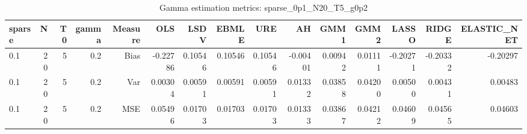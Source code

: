 \begin{table}[!htbp]\centering
\caption{Gamma estimation metrics: sparse_0p1_N20_T5_g0p2}
\label{tab:table1_sparse_0p1_N20_T5_g0p2}
\begin{tabular}{lrrrrrrrrrrrrrr}
\hline
sparse & N & T0 & gamma & Measure & OLS & LSDV & EBMLE & URE & AH & GMM1 & GMM2 & LASSO & RIDGE & ELASTIC_NET \\
\hline
0.1 & 20 & 5 & 0.2 & Bias & -0.22786 & 0.10546 & 0.10546 & 0.10546 & -0.00401 & 0.00942 & 0.01111 & -0.20271 & -0.20332 & -0.20297 \\
0.1 & 20 & 5 & 0.2 & Var & 0.00304 & 0.00591 & 0.00591 & 0.00591 & 0.01332 & 0.03858 & 0.04200 & 0.00500 & 0.00431 & 0.00483 \\
0.1 & 20 & 5 & 0.2 & MSE & 0.05496 & 0.01703 & 0.01703 & 0.01703 & 0.01333 & 0.03867 & 0.04212 & 0.04609 & 0.04565 & 0.04603 \\
\hline
\end{tabular}
\end{table}

